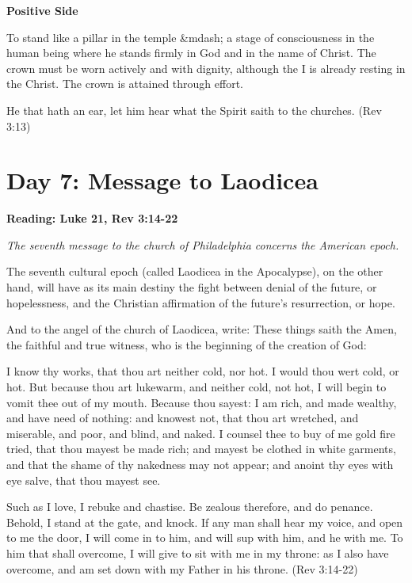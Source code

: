 \textbf{Positive Side}

To stand like a pillar in the temple \&mdash; a stage of consciousness in the human being where he stands firmly in God and in the name of Christ. The crown must be worn actively and with dignity, although the I is already resting in the Christ. The crown is attained through effort.

He that hath an ear, let him hear what the Spirit saith to the churches. (Rev 3:13)

\section{Day 7: Message to Laodicea}

\textbf{Reading: Luke 21, Rev 3:14-22}

\emph{The seventh message to the church of Philadelphia concerns the American epoch.}

\begin{quotex}
The seventh cultural epoch (called Laodicea in the Apocalypse), on the other hand, will have as its main destiny the fight between denial of the future, or hopelessness, and the Christian affirmation of the future's resurrection, or hope. 

\end{quotex}
And to the angel of the church of Laodicea, write: These things saith the Amen, the faithful and true witness, who is the beginning of the creation of God:

I know thy works, that thou art neither cold, nor hot. I would thou wert cold, or hot. But because thou art lukewarm, and neither cold, not hot, I will begin to vomit thee out of my mouth. Because thou sayest: I am rich, and made wealthy, and have need of nothing: and knowest not, that thou art wretched, and miserable, and poor, and blind, and naked. I counsel thee to buy of me gold fire tried, that thou mayest be made rich; and mayest be clothed in white garments, and that the shame of thy nakedness may not appear; and anoint thy eyes with eye salve, that thou mayest see.

Such as I love, I rebuke and chastise. Be zealous therefore, and do penance. Behold, I stand at the gate, and knock. If any man shall hear my voice, and open to me the door, I will come in to him, and will sup with him, and he with me. To him that shall overcome, I will give to sit with me in my throne: as I also have overcome, and am set down with my Father in his throne. (Rev 3:14-22)

